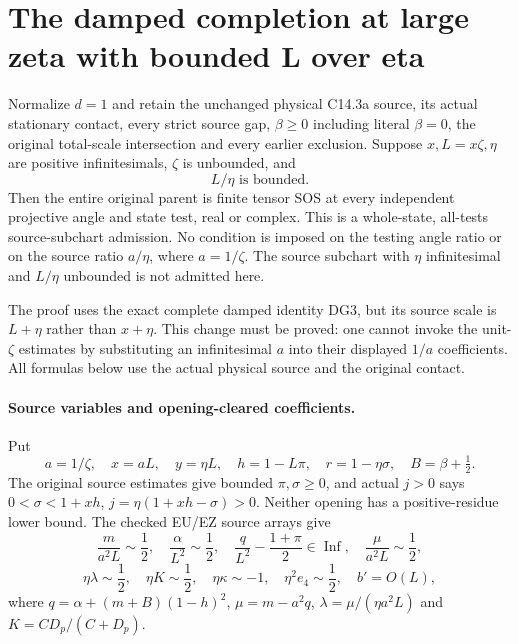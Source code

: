 \section{The damped completion at large zeta with bounded L over eta}
\label{sec:r17-large-zeta-damped}

\begin{theorem}
Normalize $d=1$ and retain the unchanged physical C14.3a source,
its actual stationary contact, every strict source gap,
$\beta\ge0$ including literal $\beta=0$, the original total-scale
intersection and every earlier exclusion. Suppose $x,L=x\zeta,\eta$
are positive infinitesimals, $\zeta$ is unbounded, and
\[
                         L/\eta\text{ is bounded}.       \tag{LD1}
\]
Then the entire original parent is finite tensor SOS at every independent
projective angle and state test, real or complex. This is a whole-state,
all-tests source-subchart admission. No condition is imposed on the
testing angle ratio or on the source ratio $a/\eta$, where $a=1/\zeta$.
The source subchart with $\eta$ infinitesimal and $L/\eta$ unbounded
is not admitted here.
\end{theorem}

The proof uses the exact complete damped identity DG3, but its source
scale is $L+\eta$ rather than $x+\eta$. This change must be proved:
one cannot invoke the unit-$\zeta$ estimates by substituting an
infinitesimal $a$ into their displayed $1/a$ coefficients. All formulas
below use the actual physical source and the original contact.

\paragraph{Source variables and opening-cleared coefficients.}
Put
\[
 a=1/\zeta,\quad x=aL,\quad y=\eta L,\quad
 h=1-L\pi,\quad r=1-\eta\sigma,\quad B=\beta+\tfrac12.
\]
The original source estimates give bounded $\pi,\sigma\ge0$, and
actual $j>0$ says
$0<\sigma<1+xh$, $j=\eta(1+xh-\sigma)>0$.
Neither opening has a positive-residue lower bound.
The checked EU/EZ source arrays give
\[
 \frac{m}{a^2L}\sim\frac12,\quad
 \frac{\alpha}{L^2}\sim\frac12,\quad
 \frac{q}{L^2}-\frac{1+\pi}{2}\in\operatorname{Inf},\quad
 \frac{\mu}{a^2L}\sim\frac12,
\]
\[
 \eta\lambda\sim\frac12,\quad
 \eta K\sim\frac12,\quad
 \eta\kappa\sim-1,\quad \eta^2e_4\sim\frac12,
 \quad b'=O(L),                                     \tag{LD2}
\]
where $q=\alpha+(m+B)(1-h)^2$, $\mu=m-a^2q$,
$\lambda=\mu/(\eta a^2L)$ and $K=CD_p/(C+D_p)$.

